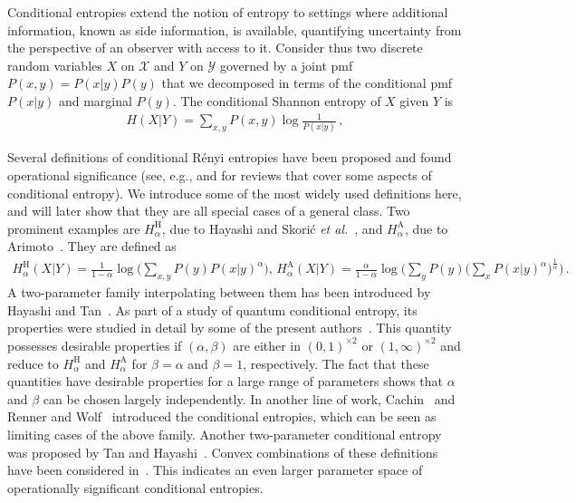 \documentclass[aps,pra,11pt,onecolumn,nofootinbib,tightenlines]{revtex4-2}
\theoremstyle{definition}
\newcommand{\mc}[1]{\mathcal{#1}}
\begin{document}
Conditional entropies extend the notion of entropy to settings where additional information, known as side information, is available, quantifying uncertainty from the perspective of an observer with access to it. 
Consider thus two discrete random variables $X$ on $\mc{X}$ and $Y$ on $\mc{Y}$ governed by a joint pmf $P(x,y) = P(x|y)P(y)$ that we decomposed in terms of the conditional pmf $P(x|y)$ and marginal $P(y)$. The conditional Shannon entropy of $X$ given $Y$ is 
\begin{align}
    H(X|Y) = \sum_{x, y} P(x,y) \log \frac{1}{P(x|y)}  \,,
\end{align}

Several definitions of conditional Rényi entropies have been proposed and found operational significance (see, e.g., \cite{teixeira2012conditional} and \cite{fehr14conditional} for reviews that cover some aspects of conditional entropy). We introduce some of the most widely used definitions here, and will later show that they are all special cases of a general class. Two prominent examples are $H_{\alpha}^{\mathrm{H}}$, due to Hayashi and Skorić \emph{et al.}~\cite{hayashi2011exponential,vskoric2011sharp}, and $H_{\alpha}^{\mathrm{A}}$, due to Arimoto~\cite{arimoto1977information}. They are defined as
\begin{align}
H_{\alpha}^{\text{H}}(X|Y) = \frac{1}{1-\alpha}\log \bigg(\sum_{x,y} P(y) P(x|y)^\alpha\bigg),\,
H_{\alpha}^{\text{A}}(X|Y)  = \frac{\alpha}{1-\alpha}\log{\bigg(\sum_y P(y)\bigg(\sum_x P(x|y)^\alpha\bigg)^\frac{1}{\alpha}\bigg)} \,.
\end{align}
A two-parameter family interpolating between them has been introduced by Hayashi and Tan~\cite{hayashi2016equivocations}.
As part of a study of quantum conditional entropy, its properties were studied in detail by some of the present authors~\cite%
{rubboli2024quantum}.
This quantity possesses desirable properties if $(\alpha,\beta)$ are either in $(0,1)^{\times 2}$ or $(1,\infty)^{\times 2}$ and reduce to $H_{\alpha}^{\mathrm{H}}$ and $H_{\alpha}^{\mathrm{A}}$ for $\beta = \alpha$ and $\beta = 1$, respectively. The fact that these quantities have desirable properties for a large range of parameters shows that $\alpha$ and $\beta$ can be chosen largely independently. In another line of work, Cachin~\cite{cachin1997entropy} and Renner and Wolf~\cite{renner2005simple} introduced the conditional entropies, which can be seen as limiting cases of the above family.
Another two-parameter conditional entropy was proposed by Tan and Hayashi~\cite%
{tan2018conditional}. Convex combinations of these definitions have been considered in~\cite{hayashi2016uniform}.
This indicates an even larger parameter space of operationally significant conditional entropies. 
\end{document}
